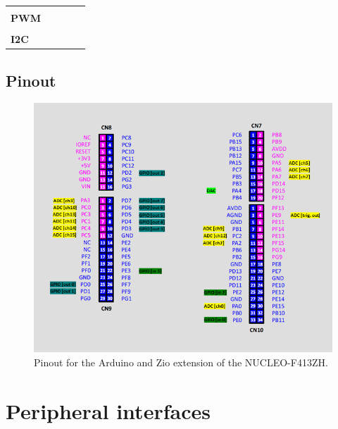 \documentclass[letterpaper,10pt,english]{hitec}
\begin{document}
\begin{table}[h!]
\begin{tabular}{l|l|lll}
\cellcolor[HTML]{C0C0C0}                                 &                                     &               &               &               \\
\multirow{-2}{*}{\cellcolor[HTML]{C0C0C0}\textbf{PWM}}   &                                     &               &               &               \\ \hline
\cellcolor[HTML]{C0C0C0}                                 &                                     &               &               &               \\
\multirow{-2}{*}{\cellcolor[HTML]{C0C0C0}\textbf{I2C}}   &                                     &               &               &              
\end{tabular}
\end{table}

\newpage 

\subsection{Pinout}

\begin{figure}[ht!]
\includegraphics[scale=0.7]{../img/nucleo_f413zh_zio_ex.png}
\caption{Pinout for the Arduino and Zio extension of the NUCLEO-F413ZH.}
\label{fig:pinout}
\end{figure}

\newpage

\section{Peripheral interfaces}
\end{document}
